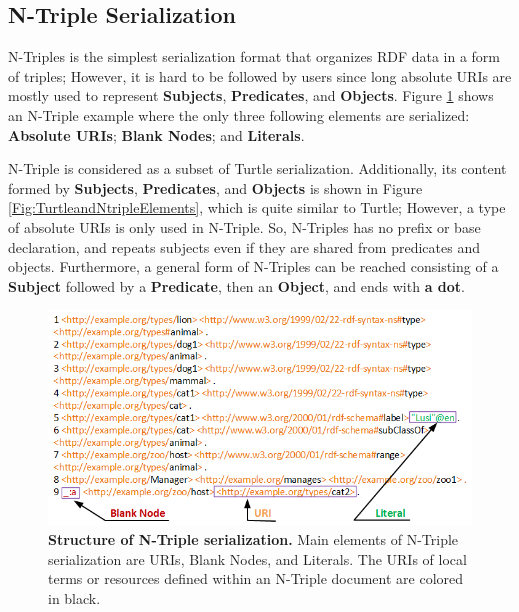 \begin{itemize}
     
\end{itemize} 

\subsection{N-Triple Serialization}
N-Triples \cite{W3C:Ntriples:Online} is the simplest serialization format that organizes RDF data in a form of triples; However, it is hard to be followed by users since long absolute URIs are mostly used to represent \textbf{Subjects}, \textbf{Predicates}, and \textbf{Objects}. 
Figure \ref{Fig:NTriplesStructure} shows an N-Triple example where the only three following elements are serialized: \textbf{Absolute URIs}; \textbf{Blank Nodes}; and \textbf{Literals}. 

N-Triple is considered as a subset of Turtle serialization. 
Additionally, its content formed by \textbf{Subjects}, \textbf{Predicates}, and \textbf{Objects} is shown in Figure \ref{Fig:TurtleandNtripleElements}, which is quite similar to Turtle; However, a type of absolute URIs is only used in N-Triple. 
So, N-Triples has no prefix or base declaration, and repeats subjects even if they are shared from predicates and objects. Furthermore, a general form of N-Triples can be reached consisting of a \textbf{Subject} followed by a \textbf{Predicate}, then an \textbf{Object}, and ends with \textbf{a dot}.   

\begin{figure}[ht]
	\begin{center}
		\includegraphics[scale=0.8,angle=0]{images/NTriplesStructure.png}
		\caption{\textbf{Structure of N-Triple serialization.} 
		Main elements of N-Triple serialization are URIs, Blank Nodes, and Literals. 
		The URIs of local terms or resources defined within an N-Triple document are colored in black.}
		\label{Fig:NTriplesStructure}
	\end{center}
\end{figure}


